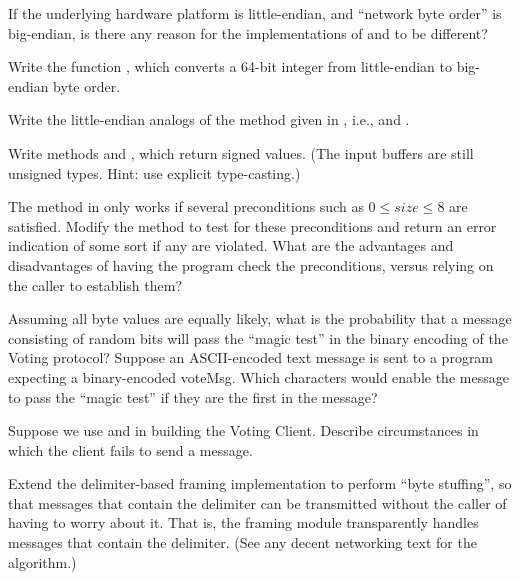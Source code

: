 \begin{exercises}
\item
If the underlying hardware platform is little-endian, and
``network byte order'' is big-endian, is there any reason for
the implementations of  and  to be different?

\item
\label{htonll}
Write the function  , which converts a 64-bit integer from little-endian to
big-endian byte order.

\item
Write the little-endian analogs of the method given in
, i.e.,  and
. 

\item
Write methods  and
, which return signed values. (The
input buffers are still unsigned types. Hint: use explicit type-casting.) 

\item
The  method in
 only works if several preconditions
such as $0 \leq size \leq 8$ are satisfied.
Modify the method to test for these
preconditions and return an error indication of some sort if any are
violated.  What are the advantages and disadvantages of having the
program check the preconditions, versus relying on the caller to
establish them?

\item Assuming all byte values are equally likely, what is the
probability that a message consisting of random bits will pass the
``magic test'' in the binary encoding of the Voting protocol?
Suppose an ASCII-encoded text
message is sent to a program expecting a binary-encoded voteMsg. Which
characters would enable the message to pass the ``magic test'' if they
are the first in the message?

\item Suppose we use  and
   in building the Voting Client.  Describe
circumstances in which the client fails to send a message.

\item
Extend the delimiter-based framing implementation to perform ``byte stuffing'',
so that messages that contain the delimiter can be transmitted without
the caller of  having to worry about it.
That is, the framing module transparently
handles messages that contain the delimiter.
(See any decent networking text for the algorithm.)


\end{exercises}
